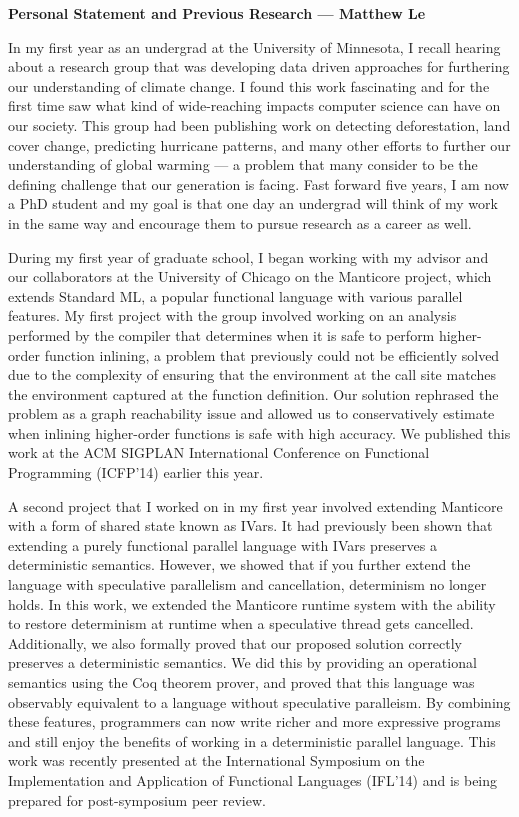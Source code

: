 \documentclass[12pt]{article}
\begin{document}
\centerline{\bf Personal Statement and Previous Research --- Matthew Le} 


In my first year as an undergrad at the University of Minnesota, I recall hearing about a research group that was developing data driven approaches for furthering our understanding of climate change. I found this work fascinating and for the first time saw what kind of wide-reaching impacts computer science can have on our society. This group had been publishing work on detecting deforestation, land cover change, predicting hurricane patterns, and many other efforts to further our understanding of global warming --- a problem that many consider to be the defining challenge that our generation is facing. Fast forward five years, I am now a PhD student and my goal is that one day an undergrad will think of my work in the same way and encourage them to pursue research as a career as well.

During my first year of graduate school, I began working with my advisor and our collaborators at the University of Chicago on the Manticore project, which extends Standard ML, a popular functional language with various parallel features.  My first project with the group involved working on an analysis performed by the compiler that determines when it is safe to perform higher-order function inlining, a problem that previously could not be efficiently solved due to the complexity of ensuring that the environment at the call site matches the environment captured at the function definition.  Our solution rephrased the problem as a graph reachability issue and allowed us to conservatively estimate when inlining higher-order functions is safe with high accuracy.  We published this work at the ACM SIGPLAN International Conference on Functional Programming (ICFP'14) earlier this year.  

A second project that I worked on in my first year involved extending Manticore with a form of shared state known as IVars.  It had previously been shown that extending a purely functional parallel language with IVars preserves a deterministic semantics.  However, we showed that if you further extend the language with speculative parallelism and cancellation, determinism no longer holds.  In this work, we extended the Manticore runtime system with the ability to restore determinism at runtime when a speculative thread gets cancelled.  Additionally, we also formally proved that our proposed solution correctly preserves a deterministic semantics.  We did this by providing an operational semantics using the Coq theorem prover, and proved that this language was observably equivalent to a language without speculative paralleism.  By combining these features, programmers can now write richer and more expressive programs and still enjoy the benefits of working in a deterministic parallel language.  This work was recently presented at the International Symposium on the Implementation and Application of Functional Languages (IFL'14) and is being prepared for post-symposium peer review.  
\end{document}
